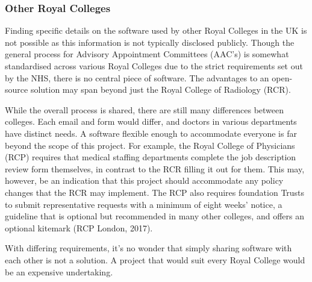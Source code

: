 \subsubsection{Other Royal Colleges}
Finding specific details on the software used by other Royal Colleges in the UK is not possible as this information is not typically disclosed publicly. Though the general process for Advisory Appointment Committees (AAC’s) is somewhat standardised across various Royal Colleges due to the strict requirements set out by the NHS, there is no central piece of software. The advantages to an open-source solution may span beyond just the Royal College of Radiology (RCR). 

While the overall process is shared, there are still many differences between colleges. Each email and form would differ, and doctors in various departments have distinct needs. A software flexible enough to accommodate everyone is far beyond the scope of this project. For example, the Royal College of Physicians (RCP) requires that medical staffing departments complete the job description review form themselves, in contrast to the RCR filling it out for them. This may, however, be an indication that this project should accommodate any policy changes that the RCR may implement. The RCP also requires foundation Trusts to submit representative requests with a minimum of eight weeks’ notice, a guideline that is optional but recommended in many other colleges, and offers an optional kitemark (RCP London, 2017).

With differing requirements, it’s no wonder that simply sharing software with each other is not a solution. A project that would suit every Royal College would be an expensive undertaking.